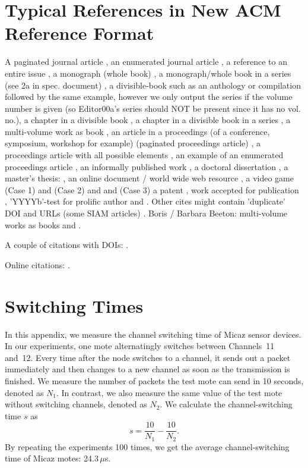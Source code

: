 \section{Typical References in New ACM Reference Format}
A paginated journal article \cite{Abril07}, an enumerated
journal article \cite{Cohen07}, a reference to an entire issue \cite{JCohen96},
a monograph (whole book) \cite{Kosiur01}, a monograph/whole book in a series (see 2a in spec. document)
\cite{Harel79}, a divisible-book such as an anthology or compilation \cite{Editor00}
followed by the same example, however we only output the series if the volume number is given
\cite{Editor00a} (so Editor00a's series should NOT be present since it has no vol. no.),
a chapter in a divisible book \cite{Spector90}, a chapter in a divisible book
in a series \cite{Douglass98}, a multi-volume work as book \cite{Knuth97},
an article in a proceedings (of a conference, symposium, workshop for example)
(paginated proceedings article) \cite{Andler79}, a proceedings article
with all possible elements \cite{Smith10}, an example of an enumerated
proceedings article \cite{VanGundy07},
an informally published work \cite{Harel78}, a doctoral dissertation \cite{Clarkson85},
a master's thesis: \cite{anisi03}, an online document / world wide web
resource \cite{Thornburg01, Ablamowicz07, Poker06}, a video game (Case 1) \cite{Obama08} and (Case 2) \cite{Novak03}
and \cite{Lee05} and (Case 3) a patent \cite{JoeScientist001},
work accepted for publication \cite{rous08}, 'YYYYb'-test for prolific author
\cite{SaeediMEJ10} and \cite{SaeediJETC10}. Other cites might contain
'duplicate' DOI and URLs (some SIAM articles) \cite{Kirschmer:2010:AEI:1958016.1958018}.
Boris / Barbara Beeton: multi-volume works as books
\cite{MR781536} and \cite{MR781537}.

A couple of citations with DOIs: \cite{2004:ITE:1009386.1010128,
  Kirschmer:2010:AEI:1958016.1958018}.

Online citations: \cite{TUGInstmem, Thornburg01, CTANacmart}.

\appendix
\section{Switching Times}

In this appendix, we measure the channel switching time of Micaz
\cite{CROSSBOW} sensor devices.  In our experiments, one mote
alternatingly switches between Channels~11 and~12. Every time after
the node switches to a channel, it sends out a packet immediately and
then changes to a new channel as soon as the transmission is finished.
We measure the number of packets the test mote can send in 10 seconds,
denoted as $N_{1}$. In contrast, we also measure the same value of the
test mote without switching channels, denoted as $N_{2}$. We calculate
the channel-switching time $s$ as
\begin{displaymath}%
s=\frac{10}{N_{1}}-\frac{10}{N_{2}}.
\end{displaymath}%
By repeating the experiments 100 times, we get the average
channel-switching time of Micaz motes: 24.3\,$\mu$s.

